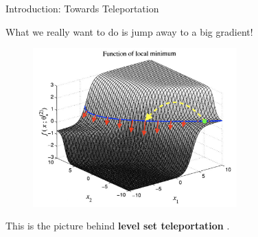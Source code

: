 \documentclass[usenames,dvipsnames,mathserif,notheorems]{beamer}
\newcommand{\good}[1]{\textcolor{good}{#1}}
\begin{document}
\begin{frame}{Introduction: Towards Teleportation}

    What we really want to do is \good{jump away} to a big gradient!

    \pause

    \begin{figure}[]
        \centering
        \includegraphics[width=0.7\textwidth]{assets/loss_surface_teleport.png}
    \end{figure}

    \pause

    This is the picture  behind \textbf{level set teleportation} \citep{zhao2023symmetry}.


\end{frame}
\end{document}
